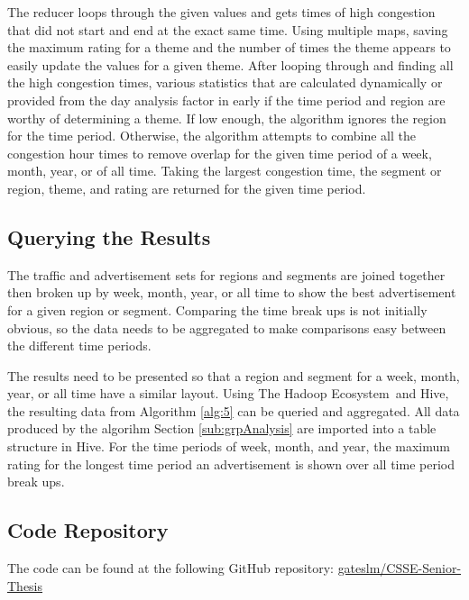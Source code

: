 \documentclass[titlepage,twocolumn]{article}
\newcommand{\HadoopEcosystem}{Hadoop Ecosystem}
\begin{document}
\par The reducer loops through the given values and gets times of high congestion that did not start and end at the exact same time. Using multiple maps, saving the maximum rating for a theme and the number of times the theme appears to easily update the values for a given theme. After looping through and finding all the high congestion times, various statistics that are calculated dynamically or provided from the day analysis factor in early if the time period and region are worthy of determining a theme. If low enough, the algorithm ignores the region for the time period. Otherwise, the algorithm attempts to combine all the congestion hour times to remove overlap for the given time period of a week, month, year, or of all time. Taking the largest congestion time, the segment or region, theme, and rating are returned for the given time period. 

\subsection{Querying the Results}

\par The traffic and advertisement sets for regions and segments are joined together then broken up by week, month, year, or all time to show the best advertisement for a given region or segment. Comparing the time break ups is not initially obvious, so the data needs to be aggregated to make comparisons easy between the different time periods. 

\par The results need to be presented so that a region and segment for a week, month, year, or all time have a similar layout. Using The \HadoopEcosystem\ and Hive, the resulting data from Algorithm \ref{alg:5} can be queried and aggregated. All data produced by the algorihm Section \ref{sub:grpAnalysis} are imported into a table structure in Hive. For the time periods of week, month, and year, the maximum rating for the longest time period an advertisement is shown over all time period break ups.

\subsection{Code Repository}
\label{sub:github}

\par The code can be found at the following GitHub repository: \href{https://github.com/gateslm/CSSE-Senior-Thesis}{gateslm/CSSE-Senior-Thesis} \cite{github}
\end{document}
